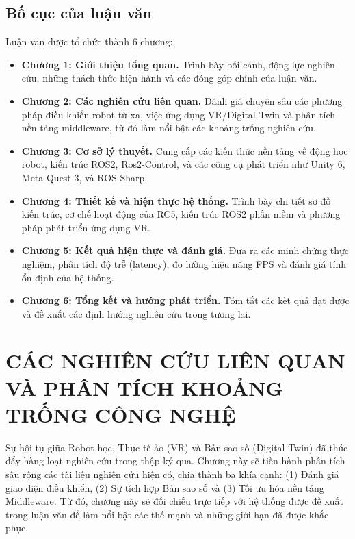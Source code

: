\section{Bố cục của luận văn}
Luận văn được tổ chức thành 6 chương:
\begin{itemize}
    \item \textbf{Chương 1: Giới thiệu tổng quan.} Trình bày bối cảnh, động lực nghiên cứu, những thách thức hiện hành và các đóng góp chính của luận văn.
    \item \textbf{Chương 2: Các nghiên cứu liên quan.} Đánh giá chuyên sâu các phương pháp điều khiển robot từ xa, việc ứng dụng VR/Digital Twin và phân tích nền tảng middleware, từ đó làm nổi bật các khoảng trống nghiên cứu.
    \item \textbf{Chương 3: Cơ sở lý thuyết.} Cung cấp các kiến thức nền tảng về động học robot, kiến trúc ROS2, Ros2-Control, và các công cụ phát triển như Unity 6, Meta Quest 3, và ROS-Sharp.
    \item \textbf{Chương 4: Thiết kế và hiện thực hệ thống.} Trình bày chi tiết sơ đồ kiến trúc, cơ chế hoạt động của RC5, kiến trúc ROS2 phần mềm và phương pháp phát triển ứng dụng VR.
    \item \textbf{Chương 5: Kết quả hiện thực và đánh giá.} Đưa ra các minh chứng thực nghiệm, phân tích độ trễ (latency), đo lường hiệu năng FPS và đánh giá tính ổn định của hệ thống.
    \item \textbf{Chương 6: Tổng kết và hướng phát triển.} Tóm tắt các kết quả đạt được và đề xuất các định hướng nghiên cứu trong tương lai.
\end{itemize}


\chapter{CÁC NGHIÊN CỨU LIÊN QUAN VÀ PHÂN TÍCH KHOẢNG TRỐNG CÔNG NGHỆ}
\label{chap:related_works}

Sự hội tụ giữa Robot học, Thực tế ảo (VR) và Bản sao số (Digital Twin) đã thúc đẩy hàng loạt nghiên cứu trong thập kỷ qua. Chương này sẽ tiến hành phân tích sâu rộng các tài liệu nghiên cứu hiện có, chia thành ba khía cạnh: (1) Đánh giá giao diện điều khiển, (2) Sự tích hợp Bản sao số và (3) Tối ưu hóa nền tảng Middleware. Từ đó, chương này sẽ đối chiếu trực tiếp với hệ thống được đề xuất trong luận văn để làm nổi bật các thế mạnh và những giới hạn đã được khắc phục.

